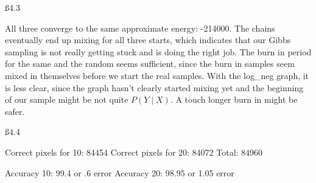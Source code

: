 \ss {4.3}

All three converge to the same approximate energy: -214000. The chains eventually end up mixing for all three starts, which indicates that our Gibbs sampling is not really getting stuck and is doing the right job. The burn in period for the same and the random seems sufficient, since the burn in samples seem mixed in themselves before we start the real samples. With the log_neg graph, it is less clear, since the graph hasn't clearly started mixing yet and the beginning of our sample might be not quite $P(Y \mid X)$. A touch longer burn in might be safer.




\ss{4.4}

Correct pixels for 10: 84454
Correct pixels for 20: 84072
Total: 84960

Accuracy 10: 99.4 or .6 error
Accuracy 20: 98.95 or 1.05 error

